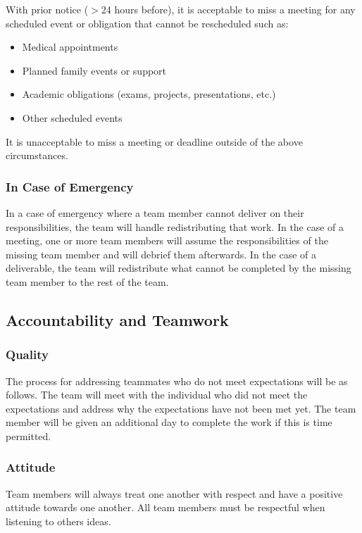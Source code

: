 \documentclass{article}
\begin{document}
\noindent With prior notice ($>$24 hours before), it is acceptable to miss a meeting for any scheduled event or obligation that cannot be rescheduled such as:
\begin{itemize}
  \item Medical appointments
  \item Planned family events or support
  \item Academic obligations (exams, projects, presentations, etc.)
  \item Other scheduled events
\end{itemize}

\noindent It is unacceptable to miss a meeting or deadline outside of the above circumstances.

\subsubsection*{In Case of Emergency}

In a case of emergency where a team member cannot deliver on their responsibilities, the team will handle redistributing that work.
In the case of a meeting, one or more team members will assume the responsibilities of the missing team member and will debrief them afterwards.
In the case of a deliverable, the team will redistribute what cannot be completed by the missing team member to the rest of the team.

\subsection*{Accountability and Teamwork}

\subsubsection*{Quality} 

The process for addressing teammates who do not meet expectations will be as follows. 
The team will meet with the individual who did not meet the expectations and address why the expectations have not been met yet.  
The team member will be given an additional day to complete the work if this is time permitted. 

\subsubsection*{Attitude}

Team members will always treat one another with respect and have a positive attitude towards one another. 
All team members must be respectful when listening to others ideas. 
\end{document}
